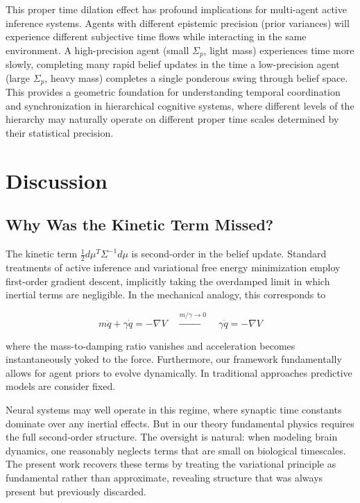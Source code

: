 \documentclass[11pt]{article}
\begin{document}
This proper time dilation effect has profound implications for multi-agent active inference systems. Agents with different epistemic precision (prior variances) will experience different subjective time flows while interacting in the same environment. A high-precision agent (small $\Sigma_p$, light mass) experiences time more slowly, completing many rapid belief updates in the time a low-precision agent (large $\Sigma_p$, heavy mass) completes a single ponderous swing through belief space. This provides a geometric foundation for understanding temporal coordination and synchronization in hierarchical cognitive systems, where different levels of the hierarchy may naturally operate on different proper time scales determined by their statistical precision.


\section{Discussion}
\label{sec:discussion}

\subsection{Why Was the Kinetic Term Missed?}

The kinetic term $\frac{1}{2}d\mu^T \Sigma^{-1} d\mu$ is second-order in the belief update. Standard treatments of active inference and variational free energy minimization employ first-order gradient descent, implicitly taking the overdamped limit in which inertial terms are negligible. In the mechanical analogy, this corresponds to

\begin{equation}
m\ddot{q} + \gamma\dot{q} = -\nabla V \quad \xrightarrow{m/\gamma \to 0} \quad \gamma\dot{q} = -\nabla V
\end{equation}

where the mass-to-damping ratio vanishes and acceleration becomes instantaneously yoked to the force. Furthermore, our framework fundamentally allows for agent priors to evolve dynamically.  In traditional approaches predictive models are consider fixed. 

Neural systems may well operate in this regime, where synaptic time constants dominate over any inertial effects. But in our theory fundamental physics requires the full second-order structure. The oversight is natural: when modeling brain dynamics, one reasonably neglects terms that are small on biological timescales. The present work recovers these terms by treating the variational principle as fundamental rather than approximate, revealing structure that was always present but previously discarded. 
\end{document}
